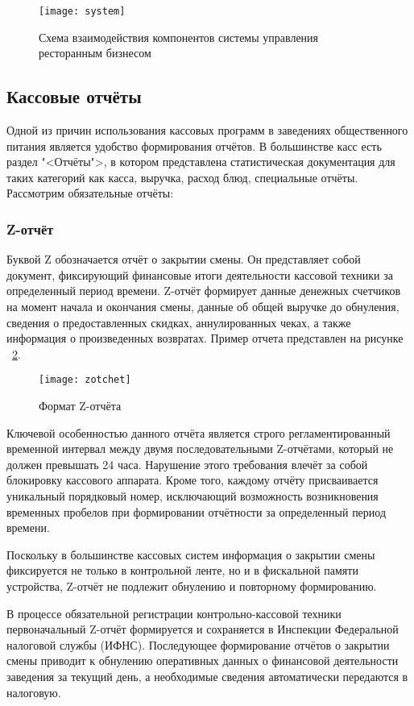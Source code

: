 \begin{figure}[ht]
	\centering
	\texttt{[image: system]} 
	\caption{Схема взаимодействия компонентов системы управления ресторанным бизнесом}
	\label{system:image}
\end{figure}


\subsection{Кассовые отчёты}
Одной из причин использования кассовых программ в заведениях общественного питания является удобство формирования отчётов. В большинстве касс есть раздел "<Отчёты">, в котором представлена статистическая документация для таких категорий как касса, выручка, расход блюд, специальные отчёты. Рассмотрим обязательные отчёты: 

\subsubsection{Z-отчёт}
Буквой Z обозначается отчёт о закрытии смены. Он представляет собой документ, фиксирующий финансовые итоги деятельности кассовой техники за определенный период времени. Z-отчёт формирует данные денежных счетчиков на момент начала и окончания смены, данные об общей выручке до обнуления, сведения о предоставленных скидках, аннулированных чеках, а также информация о произведенных возвратах. Пример отчета представлен на рисунке ~\ref{zotchet:image}.

\begin{figure}[ht]
	\centering
	\texttt{[image: zotchet]} 
	\caption{Формат Z-отчёта}
	\label{zotchet:image}
\end{figure}

Ключевой особенностью данного отчёта является строго регламентированный временной интервал между двумя последовательными Z-отчётами, который не должен превышать 24 часа. Нарушение этого требования влечёт за собой блокировку кассового аппарата. Кроме того, каждому отчёту присваивается уникальный порядковый номер, исключающий возможность возникновения временных пробелов при формировании отчётности за определенный период времени.  

Поскольку в большинстве кассовых систем информация о закрытии смены фиксируется не только в контрольной ленте, но и в фискальной памяти устройства, Z-отчёт не подлежит обнулению и повторному формированию.  

В процессе обязательной регистрации контрольно-кассовой техники первоначальный Z-отчёт формируется и сохраняется в Инспекции Федеральной налоговой службы (ИФНС). Последующее формирование отчётов о закрытии смены приводит к обнулению оперативных данных о финансовой деятельности заведения за текущий день, а необходимые сведения автоматически передаются в налоговую. 

